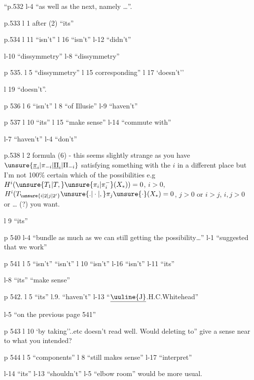 
``p.532 l-4 ``as well as the next, namely \ldots{}''.

p.533 l 1 after (2) ``its''

p.534 l 11 ``isn't'' \quad l 16 ``isn't'' \quad l-12 ``didn't''

l-10 ``dissymmetry'' \quad l-8 ``dissymmetry''

p 535. l 5 ``dissymmetry'' \quad l 15 corresponding'' \quad l 17 `doesn't''

l 19 ``doesn't''.

p 536 l 6 ``isn't'' \quad l 8 ``of Illusie'' \quad l-9 ``haven't''

p 537 l 10 ``its'' \quad l 15 ``make sense'' \quad l-14 ``commute with''

l-7 ``haven't'' \quad l-4 ``don't''

p.538 l 2 formula (6) - this seems slightly strange as you have $\unsure{\underline{\pi}_{i}|\pi_{-i}|\underline{\Pi}_{i}|\Pi_{-i}}$ satisfying something with the $i$ in a different place but I'm not 100\% certain  which of the possibilities e.g $H^{i}(\unsure{T_{1}|T,}\unsure{\pi_{i}|\pi_{i}^{-}}(X_{\ast}))=0$, $i>0$, $H^{i}(T_{\unsure{i|2|j|2'}}{\unsure{.|\cdot|,}}\pi_{j}\unsure{\cdot}(X_{\ast})=0$, $j>0$ or $i>j$,  \unsure{,}$i,j>0$ or \ldots{} (?) you want.

l 9 ``its''

p 540  l-4 ``bundle as much as we can   still getting the possibility\ldots'' \quad l-1 ``suggested that we work''

p 541 l 5 ``isn't'' ``isn't'' \quad l 10 ``isn't'' \quad l-16 ``isn't'' \quad l-11 ``its''

l-8 ``its''  ``make sense''

p 542. l 5 ``its'' \quad l.9. ``haven't'' \quad l-13 ``$\underline{\text{\uuline{J}}}$.H.C.Whitehead''

l-5 ``on the previous page 541''

p 543 l 10 `by taking''..etc doesn't read well. Would deleting to'' give  a sense near to what you intended?

p 544 l 5 ``components'' \quad l 8 ``still makes sense'' \quad l-17 ``interpret''

l-14 ``its'' \quad l-13 ``shouldn't'' \quad l-5 ``elbow room'' would be more usual.

